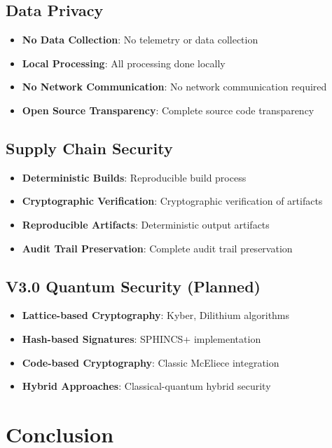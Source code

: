 \documentclass[12pt,a4paper]{article}
\begin{document}
\subsection{Data Privacy}
\begin{itemize}
    \item \textbf{No Data Collection}: No telemetry or data collection
    \item \textbf{Local Processing}: All processing done locally
    \item \textbf{No Network Communication}: No network communication required
    \item \textbf{Open Source Transparency}: Complete source code transparency
\end{itemize}

\subsection{Supply Chain Security}
\begin{itemize}
    \item \textbf{Deterministic Builds}: Reproducible build process
    \item \textbf{Cryptographic Verification}: Cryptographic verification of artifacts
    \item \textbf{Reproducible Artifacts}: Deterministic output artifacts
    \item \textbf{Audit Trail Preservation}: Complete audit trail preservation
\end{itemize}

\subsection{V3.0 Quantum Security (Planned)}
\begin{itemize}
    \item \textbf{Lattice-based Cryptography}: Kyber, Dilithium algorithms
    \item \textbf{Hash-based Signatures}: SPHINCS+ implementation
    \item \textbf{Code-based Cryptography}: Classic McEliece integration
    \item \textbf{Hybrid Approaches}: Classical-quantum hybrid security
\end{itemize}

\newpage

\section{Conclusion}
\end{document}
